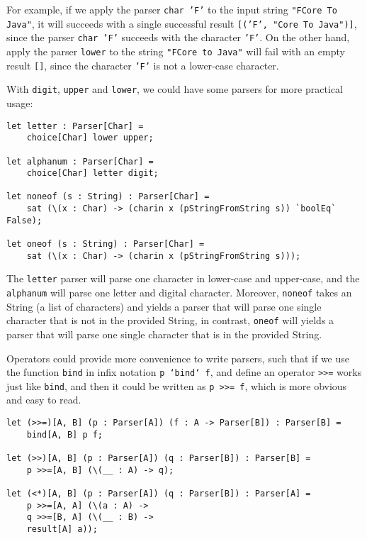 For example, if we apply the parser \texttt{char 'F'} to the input string \texttt{"FCore To Java"}, it will succeeds with a single successful result \texttt{[('F', "Core To Java")]}, since the parser \texttt{char 'F'} succeeds with the character \texttt{'F'}. On the other hand, apply the parser \texttt{lower} to the string \texttt{"FCore to Java"} will fail with an empty result \texttt{[]}, since the character \texttt{'F'} is not a lower-case character.

With \texttt{digit}, \texttt{upper} and \texttt{lower}, we could have some parsers for more practical usage:

\begin{lstlisting}
let letter : Parser[Char] =
    choice[Char] lower upper;

let alphanum : Parser[Char] =
    choice[Char] letter digit;

let noneof (s : String) : Parser[Char] =
    sat (\(x : Char) -> (charin x (pStringFromString s)) `boolEq` False);

let oneof (s : String) : Parser[Char] =
    sat (\(x : Char) -> (charin x (pStringFromString s)));
\end{lstlisting}

The \texttt{letter} parser will parse one character in lower-case and upper-case, and the \texttt{alphanum} will parse one letter and digital character. Moreover, \texttt{noneof} takes an String (a list of characters) and yields a parser that will parse one single character that is not in the provided String, in contrast, \texttt{oneof} will yields a parser that will parse one single character that is in the provided String.

Operators could provide more convenience to write parsers, such that if we use the function \texttt{bind} in infix notation \texttt{p `bind` f}, and define an operator \texttt{>>=} works just like \texttt{bind}, and then it could be written as \texttt{p >>= f}, which is more obvious and easy to read.

\begin{lstlisting}
let (>>=)[A, B] (p : Parser[A]) (f : A -> Parser[B]) : Parser[B] =
    bind[A, B] p f;

let (>>)[A, B] (p : Parser[A]) (q : Parser[B]) : Parser[B] =
    p >>=[A, B] (\(__ : A) -> q);

let (<*)[A, B] (p : Parser[A]) (q : Parser[B]) : Parser[A] =
    p >>=[A, A] (\(a : A) ->
    q >>=[B, A] (\(__ : B) ->
    result[A] a));
\end{lstlisting}

